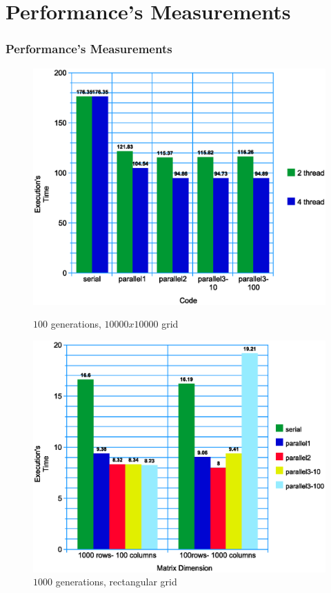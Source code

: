 \documentclass{beamer}
\begin{document}
\section{Performance's Measurements}
\begin{frame}
	\frametitle{Performance's Measurements}

	\begin{figure}
		\centering
		\begin{minipage}{0.5\textwidth}
			\centering
			\includegraphics[width=\linewidth]{../report/10000-100.eps}
			\caption{$100$ generations, $10000x10000$ grid}
		\end{minipage}%
		\begin{minipage}{0.5\textwidth}
			\centering
			\includegraphics[width=\linewidth]{../report/matdim.eps}
			\caption{$1000$ generations, rectangular grid}
		\end{minipage}
	\end{figure}
\end{frame}
\end{document}

